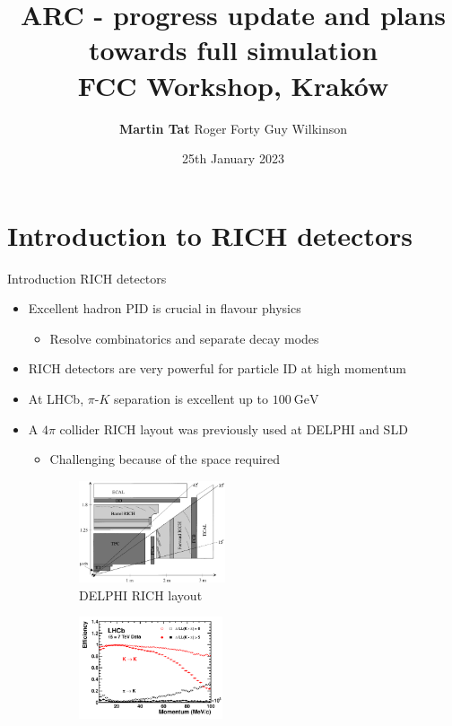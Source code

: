 \documentclass{beamer}
\title[ARC]{ARC - progress update and plans towards full simulation \\FCC Workshop, Kraków}
\author{\textbf{Martin Tat}\inst{1}\hspace{1.1em} Roger Forty\inst{2}\hspace{1.1em} Guy Wilkinson\inst{1}}
\institute{\inst{1}University of Oxford \and \inst{2}CERN}
\date{25th January 2023}
\begin{document}
\begin{frame}
  \titlepage
\end{frame}


\section{Introduction to RICH detectors}
\begin{frame}{Introduction RICH detectors}
  \begin{itemize}
    \setlength\itemsep{0.5em}
    \item{Excellent hadron PID is crucial in flavour physics}
    \begin{itemize}
      \item{Resolve combinatorics and separate decay modes}
    \end{itemize}
    \item{RICH detectors are very powerful for particle ID at high momentum}
    \item{At LHCb, $\pi$-$K$ separation is excellent up to $\SI{100}{\giga\eV}$}
    \item{A $4\pi$ collider RICH layout was previously used at DELPHI and SLD}
    \begin{itemize}
      \item{Challenging because of the space required}
    \end{itemize}
  \end{itemize}
  \begin{figure}
    \centering
    \vspace{-0.2cm}
    \begin{subfigure}{0.35\textwidth}
      \includegraphics[height = 3.0cm]{Plots/DELPHI_RICH.jpg}
      \caption{DELPHI RICH layout}
    \end{subfigure}%
    \begin{subfigure}{0.35\textwidth}
      \includegraphics[height = 3.0cm]{Plots/KandPi_2_K.pdf}

\end{subfigure}
\end{figure}
\end{frame}
\end{document}
